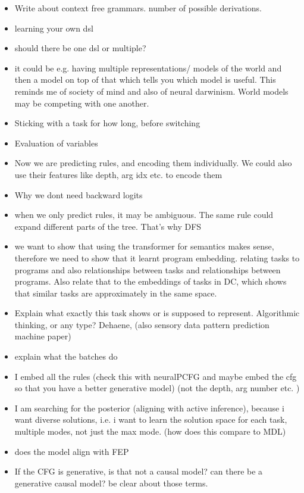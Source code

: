 \begin{itemize}
    \item Write about context free grammars. number of possible derivations.
    \item learning your own dsl
    \item should there be one dsl or multiple?
    \item it could be e.g. having multiple representations/ models of the world and then a model on top of that which tells you which model is useful. This reminds me of society of mind and also of neural darwinism. World models may be competing with one another. 
    \item Sticking with a task for how long, before switching
    \item Evaluation of variables
    \item Now we are predicting rules, and encoding them individually. We could also use their features like depth, arg idx etc. to encode them 
    \item Why we dont need backward logits
    \item when we only predict rules, it may be ambiguous. The same rule could expand different parts of the tree. That's why DFS
    \item we want to show that using the transformer for semantics makes sense, therefore we need to show that it learnt program embedding. relating tasks to programs and also relationships between tasks and relationships between programs. Also relate that to the embeddings of tasks in DC, which shows that similar tasks are approximately in the same space.
    \item Explain what exactly this task shows or is supposed to represent. Algorithmic thinking, or any type? Dehaene, (also sensory data pattern prediction machine paper)
    \item explain what the batches do
    \item I embed all the rules (check this with neuralPCFG and maybe embed the cfg so that you have a better generative model) (not the depth, arg number etc. )
    \item I am searching for the posterior (aligning with active inference), because i want diverse solutions, i.e. i want to learn the solution space for each task, multiple modes, not just the max mode. (how does this compare to MDL)
    \item does the model align with FEP
    \item If the CFG is generative, is that not a causal model? can there be a generative causal model? be clear about those terms. 

\end{itemize}
